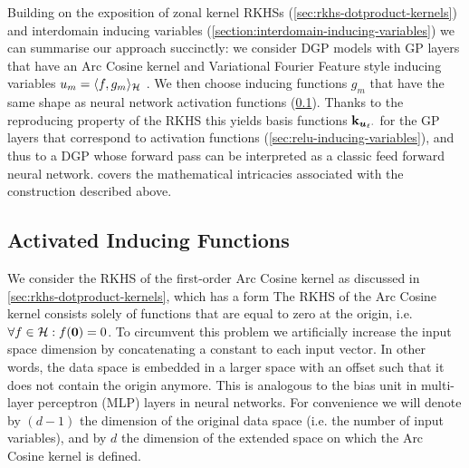 Building on the exposition of zonal kernel RKHSs (\cref{sec:rkhs-dotproduct-kernels}) and interdomain inducing variables (\cref{section:interdomain-inducing-variables}) we can summarise our approach succinctly: we consider DGP models with GP layers that have an Arc Cosine kernel and Variational Fourier Feature style inducing variables $u_m = \langle f, {g}_m \rangle_{{\mathcal{H}}}$ \citep{hensman2017variational}. We then choose inducing functions $g_m$ that have the same shape as neural network activation functions (\cref{sec:inducing-function}). Thanks to the reproducing property of the RKHS this yields basis functions $\mathbf{k}_{\bm{u}_\ell \cdot}$ for the GP layers that correspond to activation functions (\cref{sec:relu-inducing-variables}), and thus to a DGP whose forward pass can be interpreted as a classic feed forward neural network.  covers the mathematical intricacies associated with the construction described above.

\subsection{Activated Inducing Functions}
\label{sec:inducing-function}

We consider the RKHS of the first-order Arc Cosine kernel as discussed in \cref{sec:rkhs-dotproduct-kernels}, which has a form
The RKHS of the Arc Cosine kernel consists solely of functions that are equal to zero at the origin, i.e. $\forall f \in {\mathcal{H}}: f(\bm{0}) = 0$. 
To circumvent this problem we artificially increase the input space dimension by concatenating a constant to each input vector. In other words, the data space is embedded in a larger space with an offset such that it does not contain the origin anymore. This is analogous to the bias unit in multi-layer perceptron (MLP) layers in neural networks. For convenience we will denote by $(d-1)$ the dimension of the original data space (i.e. the number of input variables), and by $d$ the dimension of the extended space on which the Arc Cosine kernel is defined.


